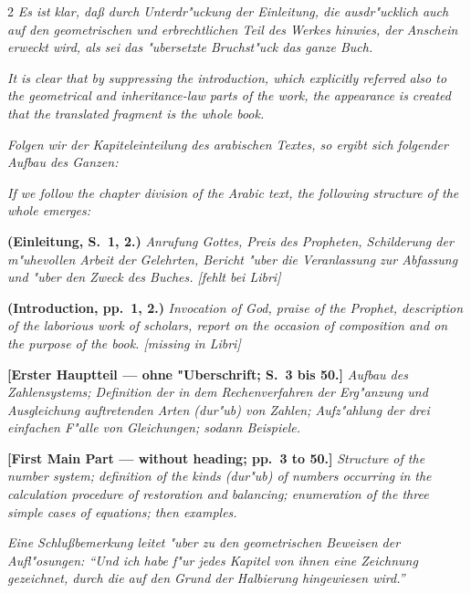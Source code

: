 \documentclass[10pt,a4paper]{article}
\newcommand{\enquote}[1]{``#1''}
\begin{document}
\begin{paracol}{2}
\textit{Es ist klar, da\ss{} durch Unterdr"uckung der Einleitung, die ausdr"ucklich auch auf den geometrischen und erbrechtlichen Teil des Werkes hinwies, der Anschein erweckt wird, als sei das "ubersetzte Bruchst"uck das ganze Buch.}

\switchcolumn

\textit{It is clear that by suppressing the introduction, which explicitly referred also to the geometrical and inheritance-law parts of the work, the appearance is created that the translated fragment is the whole book.}

\switchcolumn*

\textit{Folgen wir der Kapiteleinteilung des arabischen Textes, so ergibt sich folgender Aufbau des Ganzen:}

\switchcolumn

\textit{If we follow the chapter division of the Arabic text, the following structure of the whole emerges:}

\switchcolumn*

\textbf{(Einleitung, S.\ 1, 2.)} \textit{Anrufung Gottes, Preis des Propheten, Schilderung der m"uhevollen Arbeit der Gelehrten, Bericht "uber die Veranlassung zur Abfassung und "uber den Zweck des Buches. [fehlt bei Libri]}

\switchcolumn

\textbf{(Introduction, pp.\ 1, 2.)} \textit{Invocation of God, praise of the Prophet, description of the laborious work of scholars, report on the occasion of composition and on the purpose of the book. [missing in Libri]}

\switchcolumn*

\textbf{[Erster Hauptteil --- ohne "Uberschrift; S.\ 3 bis 50.]} \textit{Aufbau des Zahlensystems; Definition der in dem Rechenverfahren der Erg"anzung und Ausgleichung auftretenden Arten (dur"ub) von Zahlen; Aufz"ahlung der drei einfachen F"alle von Gleichungen; sodann Beispiele.}

\switchcolumn

\textbf{[First Main Part --- without heading; pp.\ 3 to 50.]} \textit{Structure of the number system; definition of the kinds (dur"ub) of numbers occurring in the calculation procedure of restoration and balancing; enumeration of the three simple cases of equations; then examples.}

\switchcolumn*

\textit{Eine Schlu\ss{}bemerkung leitet "uber zu den geometrischen Beweisen der Aufl"osungen: \enquote{Und ich habe f"ur jedes Kapitel von ihnen eine Zeichnung gezeichnet, durch die auf den Grund der Halbierung hingewiesen wird.}}


\end{paracol}
\end{document}
